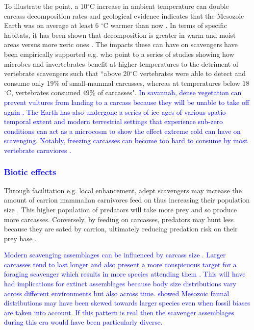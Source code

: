 \documentclass[a4paper,12pt]{article}
\begin{document}
To illustrate the point, a 10$^{\circ}$C increase in ambient temperature can double carcass decomposition rates \citep{parmenter2009carrion} and geological evidence indicates that the Mesozoic Earth was on average at least 6 $^{\circ}$C warmer than now \citep{sellwood2006mesozoic}.
In terms of specific habitats, it has been shown that decomposition is greater in warm and moist areas versus more xeric ones \citep{beasley2015vertebrates}.
The impacts these can have on scavengers have been empirically supported e.g. \cite{beasley2015vertebrates} who point to a series of studies showing how microbes and invertebrates benefit at higher temperatures to the detriment of vertebrate scavengers such that ``above 20$^{\circ}$C vertebrates were able to detect and consume only 19\% of small-mammal carcasses, whereas at temperatures below 18$^{\circ}$C, vertebrates consumed 49\% of carcasses".
\textcolor{blue}{In savannah, dense vegetation can prevent vultures from landing to a carcass because they will be unable to take off again \citep{bamford2009effect}. 
The Earth has also undergone a series of ice ages of various spatio-temporal extent \citep{diedrich2012cave} and modern terrestrial settings that experience sub-zero conditions can act as a microcosm to show the effect extreme cold can have on scavenging.
Notably, freezing carcasses can become too hard to consume by most vertebrate carnviores \citep{selva2003scavenging}.}

\subsubsection{\textcolor{blue}{Biotic effects}}
Through facilitation e.g. local enhancement, adept scavengers may increase the amount of carrion mammalian carnivores feed on thus increasing their population size \citep{moleon2014inter}. 
This higher population of predators will take more prey and so produce more carcasses.
Conversely, by feeding on carcasses, predators may hunt less because they are sated by carrion, ultimately reducing predation risk on their prey base \citep{moleon2014inter}. 

\textcolor{blue}{Modern scavenging assemblages can be influenced by carcass size \citep{moleon2015carcass}. 
Larger carcasses tend to last longer and also present a more conspicuous target for a foraging scavenger which results in more species attending them \citep{moleon2015carcass}.
This will have had implications for extinct assemblages because body size distributions vary across different environments but also across time. 
\cite{10.1371/journal.pone.0051925} showed Mesozoic faunal distributions may have been skewed towards larger species even when fossil biases are taken into account. 
If this pattern is real then the scavenger assemblages during this era would have been particularly diverse.}
\end{document}
